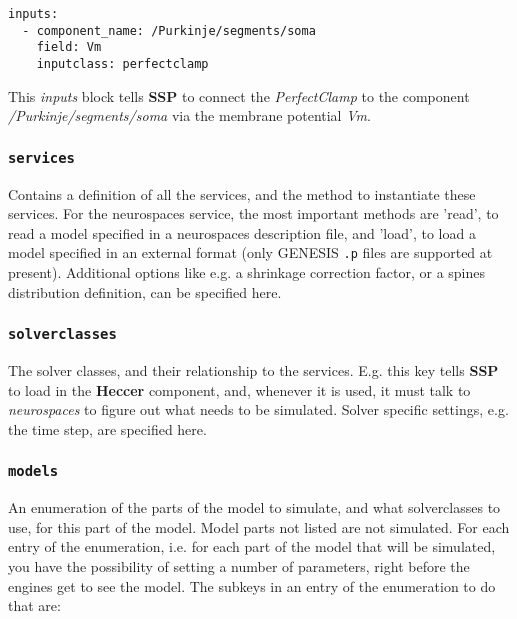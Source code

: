 \documentclass[12pt]{article}
\begin{document}
\begin{verbatim}
inputs:
  - component_name: /Purkinje/segments/soma
    field: Vm
    inputclass: perfectclamp
\end{verbatim}

This {\it inputs} block tells {\bf SSP} to connect the {\it PerfectClamp} to the component {\it /Purkinje/segments/soma}
 via the membrane potential {\it Vm}.

\subsubsection*{\tt services}

    Contains a definition of all the services, and the method to instantiate these services. For the neurospaces service, the most important methods are 'read', to read a model specified in a neurospaces description file, and 'load', to load a model specified in an external format (only GENESIS {\tt .p} files are supported at present). Additional options like e.g. a shrinkage correction factor, or a spines distribution definition, can be specified here. 

\subsubsection*{\tt solverclasses}

    The solver classes, and their relationship to the services. E.g. this key tells {\bf SSP} to load in the {\bf Heccer} component, and, whenever it is used, it must talk to {\it neurospaces} to figure out what needs to be simulated. Solver specific settings, e.g. the time step, are specified here. 

\subsubsection*{\tt models}

    An enumeration of the parts of the model to simulate, and what solverclasses to use, for this part of the model. Model parts not listed are not simulated. For each entry of the enumeration, i.e. for each part of the model that will be simulated, you have the possibility of setting a number of parameters, right before the engines get to see the model. The subkeys in an entry of the enumeration to do that are: 
\end{document}

